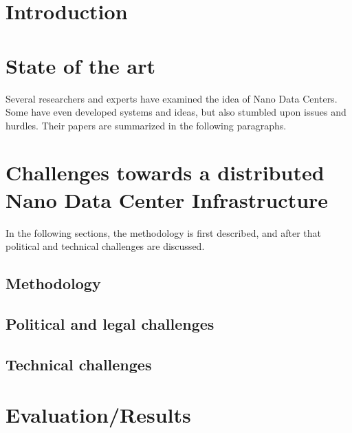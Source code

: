 
\section{Introduction}


\section{State of the art}
\label{StateOfTheArt}
Several researchers and experts have examined the idea of Nano Data Centers. Some have even developed systems and ideas, but also stumbled upon issues and hurdles. Their papers are summarized in the following paragraphs. 




\section{Challenges towards a distributed Nano Data Center Infrastructure}
In the following sections, the methodology is first described, and after that political and technical challenges are discussed. 

\subsection{Methodology}



\subsection{Political and legal challenges}


\subsection{Technical challenges}


\section{Evaluation/Results}


